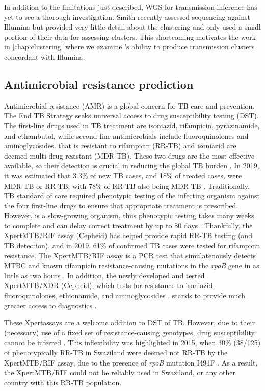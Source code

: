 In addition to the limitations just described, \ont{} WGS for transmission inference has yet to see a thorough investigation. Smith \etal{} recently assessed \ont{} sequencing against Illumina but provided very little detail about the clustering and only used a small portion of their data for assessing clusters. This shortcoming motivates the work in \autoref{chap:clustering} where we examine \ont{}'s ability to produce transmission clusters concordant with Illumina.

\subsection{Antimicrobial resistance prediction}
Antimicrobial resistance (AMR) is a global concern for TB care and prevention. The End TB Strategy seeks universal access to drug susceptibility testing (DST). The first-line drugs used in TB treatment are isoniazid, rifampicin, pyrazinamide, and ethambutol, while second-line antimicrobials include fluoroquinolones and aminoglycosides. \mtb{} that is resistant to rifampicin (RR-TB) and isoniazid are deemed multi-drug resistant (MDR-TB). These two drugs are the most effective available, so their detection is crucial in reducing the global TB burden \cite{who2020}. In 2019, it was estimated that 3.3\% of new TB cases, and 18\% of treated cases, were MDR-TB or RR-TB, with 78\% of RR-TB also being MDR-TB \cite{who2020}.
Traditionally, TB standard of care required phenotypic testing of the infecting organism against the four first-line drugs to ensure that appropriate treatment is prescribed. However, \mtb{} is a slow-growing organism, thus phenotypic testing takes many weeks to complete and can delay correct treatment by up to 80 days \cite{Pankhurst2016}. Thankfully, the Xpert\textregistered MTB/RIF assay (Cepheid) has helped provide rapid RR-TB testing (and TB detection), and in 2019, 61\% of confirmed TB cases were tested for rifampicin resistance. The Xpert\textregistered MTB/RIF assay is a PCR test that simulatenously detects MTBC and known rifampicin resistance-causing mutations in the \textit{rpoB} gene in as little as two hours \cite{Boehme2011}. In addition, the newly developed and tested Xpert\textregistered MTB/XDR (Cepheid), which tests for resistance to isoniazid, fluoroquinolones, ethionamide, and aminoglycosides \cite{Cao2021}, stands to provide much greater access to diagnostics \cite{Bainomugisa2020}.

These Xpert\textregistered assays are a welcome addition to DST of TB. However, due to their (necessary) use of a fixed set of resistance-causing genotypes, drug susceptibility cannot be inferred \cite{Sanchez2015}. This inflexibility was highlighted in 2015, when 30\% (38/125) of phenotypically RR-TB in Swaziland were deemed not RR-TB by the Xpert\textregistered MTB/RIF assay, due to the presence of \textit{rpoB} mutation I491F \cite{Sanchez2015}. As a result, the Xpert\textregistered MTB/RIF could not be reliably used in Swaziland, or any other country with this RR-TB population.

